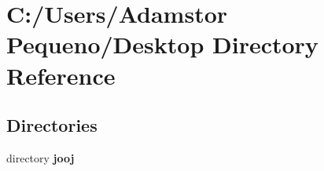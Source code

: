 \section{C\+:/\+Users/\+Adamstor Pequeno/\+Desktop Directory Reference}
\label{dir_9b8c041366ec48165d9f15993def1884}
\subsection*{Directories}
\begin{DoxyCompactItemize}
\item 
directory \textbf{ jooj}
\end{DoxyCompactItemize}
